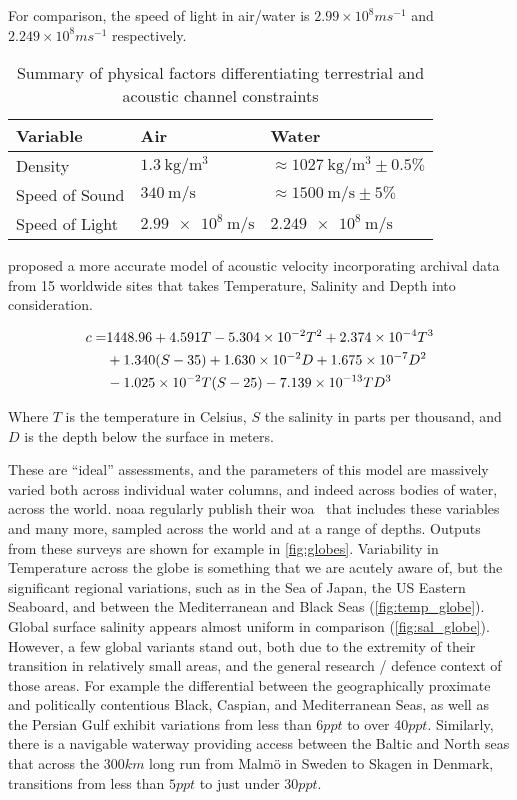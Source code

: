 For comparison, the speed of light in air/water is $2.99 \times 10^8 ms^{-1}$ and $2.249 \times 10^{8} ms^{-1}$ respectively. 

\begin{table}
	\centering
	\caption{Summary of physical factors differentiating terrestrial and acoustic channel constraints}
	\label{tab:channel_constraings_comp}
	\begin{tabularx}{0.8\textwidth}{X X X}\toprule
		Variable & Air & Water\\
		\midrule
		Density & $\SI{1.3}{\kilo\gram\per\meter\cubed}$ & $\approx\SI{1027}{\kilo\gram\per\meter\cubed}\pm0.5\%$ \\
		Speed of Sound & $\SI{340}{\meter\per\second}$ & $\approx\SI{1500}{\meter\per\second}\pm 5\%$ \\
		Speed of Light & $\SI{2.99e8}{\meter\per\second}$ & $\SI{2.249e8}{\meter\per\second}$\\
		\bottomrule
	\end{tabularx}
\end{table}
\citet{Mackenzie1981} proposed a more accurate model of acoustic velocity incorporating archival data from 15 worldwide sites that takes Temperature, Salinity and Depth into consideration.

\begin{align}
  c = & 1448.96 + 4.591 T - 5.304 \times 10^{-2} T^2 + 2.374 \times 10^{-4}T^{3}\notag\\
  & +1.340 (S-35) + 1.630\times 10^{-2}D+1.675\times 10^{-7}D^2\\
  & -1.025 \times 10^{-2}T(S-25) - 7.139\times 10^{-13}TD^3\notag
  \label{equ:mackenzie}
\end{align}

Where $T$ is the temperature in Celsius, $S$ the salinity in parts per thousand, and $D$ is the depth below the surface in meters.

These are ``ideal'' assessments, and the parameters of this model are massively varied both across individual water columns, and indeed across bodies of water, across the world. 
\gls{noaa} regularly publish their \gls{woa}~\cite{Locarnini2013,Zweng2013} that includes these variables and many more, sampled across the world and at a range of depths. 
Outputs from these surveys are shown for example in \autoref{fig:globes}. 
Variability in Temperature across the globe is something that we are acutely aware of, but the significant regional variations, such as in the Sea of Japan, the US Eastern Seaboard, and between the Mediterranean and Black Seas (\autoref{fig:temp_globe}).
Global surface salinity appears almost uniform in comparison (\autoref{fig:sal_globe}).
However, a few global variants stand out, both due to the extremity of their transition in relatively small areas, and the general research / defence context of those areas. 
For example the differential between the geographically proximate and politically contentious Black, Caspian, and Mediterranean Seas, as well as the Persian Gulf exhibit variations from less than $6ppt$ to over $40ppt$.
Similarly, there is a navigable waterway providing access between the Baltic and North seas that across the $300km$ long run from Malm{\"o} in Sweden to Skagen in Denmark, transitions from less than $5ppt$ to just under $30ppt$. 

